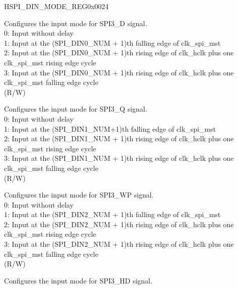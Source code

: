 \begin{register}{H}{SPI\_DIN\_MODE\_REG}{0x0024}\label{regdesc:SPI3DINMODEREG}
%
%
%
%
%
%
%
\regnewline%
\begin{regdesc}\begin{reglist}
\label{fielddesc:SPI3DIN0MODE}\item [SPI\_DIN0\_MODE] Configures the input mode for SPI3\_D signal.\\
0: Input without delay\\
1: Input at the (SPI\_DIN0\_NUM + 1)th falling edge of clk\_spi\_mst\\
2: Input at the (SPI\_DIN0\_NUM + 1)th rising edge of clk\_hclk plus one clk\_spi\_mst rising edge cycle\\
3: Input at the (SPI\_DIN0\_NUM + 1)th rising edge of clk\_hclk plus one clk\_spi\_mst falling edge cycle\\
(R/W)
\label{fielddesc:SPI3DIN1MODE}\item [SPI\_DIN1\_MODE] Configures the input mode for SPI3\_Q signal.\\
0: Input without delay\\
1: Input at the (SPI\_DIN1\_NUM+1)th falling edge of clk\_spi\_mst\\
2: Input at the (SPI\_DIN1\_NUM + 1)th rising edge of clk\_hclk plus one clk\_spi\_mst rising edge cycle\\
3: Input at the (SPI\_DIN1\_NUM + 1)th rising edge of clk\_hclk plus one clk\_spi\_mst falling edge cycle\\
    (R/W)
\label{fielddesc:SPI3DIN2MODE}\item [SPI\_DIN2\_MODE] Configures the input mode for SPI3\_WP signal.\\
0: Input without delay\\
1: Input at the (SPI\_DIN2\_NUM + 1)th falling edge of clk\_spi\_mst\\
2: Input at the (SPI\_DIN2\_NUM + 1)th rising edge of clk\_hclk plus one clk\_spi\_mst rising edge cycle\\
3: Input at the (SPI\_DIN2\_NUM + 1)th rising edge of clk\_hclk plus one clk\_spi\_mst falling edge cycle\\
(R/W)
\label{fielddesc:SPI3DIN3MODE}\item [SPI\_DIN3\_MODE] Configures the input mode for SPI3\_HD signal.\\

\end{reglist}
\end{regdesc}
\end{register}

